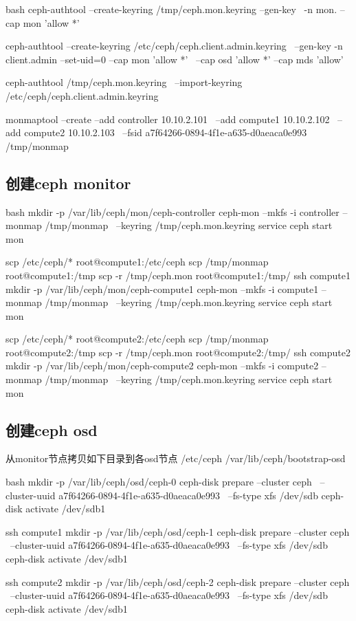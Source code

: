 \begin{code-block}{bash}
ceph-authtool --create-keyring /tmp/ceph.mon.keyring --gen-key \
    -n mon. --cap mon 'allow *'

ceph-authtool --create-keyring /etc/ceph/ceph.client.admin.keyring \
    --gen-key -n client.admin --set-uid=0 --cap mon 'allow *' \
    --cap osd 'allow *' --cap mds 'allow'

ceph-authtool /tmp/ceph.mon.keyring \
    --import-keyring /etc/ceph/ceph.client.admin.keyring

monmaptool --create --add controller 10.10.2.101  \
                    --add compute1 10.10.2.102 \
                    --add compute2 10.10.2.103  \
                    --fsid a7f64266-0894-4f1e-a635-d0aeaca0e993 /tmp/monmap
\end{code-block}

\subsection{创建ceph monitor}
\begin{code-block}{bash}
mkdir -p /var/lib/ceph/mon/ceph-controller
ceph-mon --mkfs -i controller --monmap /tmp/monmap \
    --keyring /tmp/ceph.mon.keyring
service ceph start mon

scp /etc/ceph/* root@compute1:/etc/ceph
scp /tmp/monmap root@compute1:/tmp
scp -r /tmp/ceph.mon root@compute1:/tmp/
ssh compute1
mkdir -p /var/lib/ceph/mon/ceph-compute1
ceph-mon --mkfs -i compute1 --monmap /tmp/monmap \
    --keyring /tmp/ceph.mon.keyring
service ceph start mon

scp /etc/ceph/* root@compute2:/etc/ceph
scp /tmp/monmap root@compute2:/tmp
scp -r /tmp/ceph.mon root@compute2:/tmp/
ssh compute2
mkdir -p /var/lib/ceph/mon/ceph-compute2
ceph-mon --mkfs -i compute2 --monmap /tmp/monmap \
    --keyring /tmp/ceph.mon.keyring
service ceph start mon
\end{code-block}

\subsection{创建ceph osd}
从monitor节点拷贝如下目录到各osd节点
/etc/ceph
/var/lib/ceph/bootstrap-osd

\begin{code-block}{bash}
mkdir -p /var/lib/ceph/osd/ceph-0
ceph-disk prepare --cluster ceph \
    --cluster-uuid a7f64266-0894-4f1e-a635-d0aeaca0e993 \
    --fs-type xfs  /dev/sdb
ceph-disk activate /dev/sdb1
    
ssh compute1
mkdir -p /var/lib/ceph/osd/ceph-1
ceph-disk prepare --cluster ceph \
    --cluster-uuid a7f64266-0894-4f1e-a635-d0aeaca0e993 \
    --fs-type xfs  /dev/sdb
ceph-disk activate /dev/sdb1
    
ssh compute2
mkdir -p /var/lib/ceph/osd/ceph-2
ceph-disk prepare --cluster ceph \
    --cluster-uuid a7f64266-0894-4f1e-a635-d0aeaca0e993 \
    --fs-type xfs  /dev/sdb
ceph-disk activate /dev/sdb1
\end{code-block}

